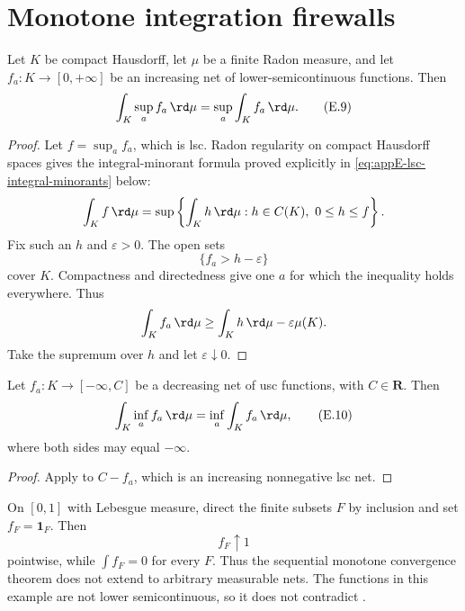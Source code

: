 \section{Monotone integration firewalls}
\label{sec:appE-monotone-integration}

\begin{theorem}\label{thm:appE-lsc-monotone}
Let \(K\) be compact Hausdorff, let \(\mu\) be a finite Radon measure, and
let \(f_a:K\to[0,+\infty]\) be an increasing net of lower-semicontinuous
functions.
Then
\[
 \int_K\sup_af_a\,\rd \mu
 =
 \sup_a\int_Kf_a\,\rd \mu.
\tag{E.9}\label{eq:appE-lsc-monotone}
\]
\end{theorem}

\begin{proof}
Let \(f=\sup_af_a\), which is lsc.
Radon regularity on compact Hausdorff spaces gives the integral-minorant
formula proved explicitly in \eqref{eq:appE-lsc-integral-minorants} below:
\[
 \int_Kf\,\rd \mu
 =
 \sup\left\{\int_Kh\,\rd \mu:
 h\in C(K),\ 0\leq h\leq f\right\}.
\]
Fix such an \(h\) and \(\varepsilon>0\).
The open sets
\[
                         \{f_a>h-\varepsilon\}
\]
cover \(K\).
Compactness and directedness give one \(a\) for which the inequality holds
everywhere.
Thus
\[
 \int_Kf_a\,\rd \mu
 \geq\int_Kh\,\rd \mu-\varepsilon\mu(K).
\]
Take the supremum over \(h\) and let \(\varepsilon\downarrow0\).
\end{proof}

\begin{corollary}\label{cor:appE-usc-monotone}
Let \(f_a:K\to[-\infty,C]\) be a decreasing net of usc functions, with
\(C\in\mathbf R\).
Then
\[
 \int_K\inf_af_a\,\rd \mu
 =
 \inf_a\int_Kf_a\,\rd \mu,
\tag{E.10}\label{eq:appE-usc-monotone}
\]
where both sides may equal \(-\infty\).
\end{corollary}

\begin{proof}
Apply  to
\(C-f_a\), which is an increasing nonnegative lsc net.
\end{proof}

\begin{example}
\label{ex:appE-measurable-net-failure}
On \([0,1]\) with Lebesgue measure, direct the finite subsets \(F\) by
inclusion and set \(f_F=\mathbf 1_F\).
Then
\[
                         f_F\uparrow1
\]
pointwise, while \(\int f_F=0\) for every \(F\).
Thus the sequential monotone convergence theorem does not extend to
arbitrary measurable nets.
The functions in this example are not lower semicontinuous, so it does not
contradict .
\end{example}

